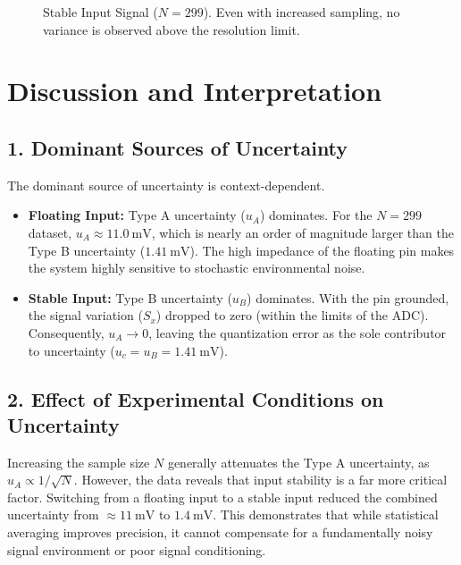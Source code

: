 \documentclass[11pt]{article}
\begin{document}
\begin{figure}[H]
  \centering
  \caption{Stable Input Signal ($N=299$). Even with increased sampling, no variance is observed above the resolution limit.}
  \label{fig:stable_300}
\end{figure}

\section{Discussion and Interpretation}

\subsection{1. Dominant Sources of Uncertainty}
The dominant source of uncertainty is context-dependent.
\begin{itemize}
  \item \textbf{Floating Input:} Type A uncertainty ($u_A$) dominates. For the $N=299$ dataset, $u_A \approx \SI{11.0}{\milli\volt}$, which is nearly an order of magnitude larger than the Type B uncertainty ($\SI{1.41}{\milli\volt}$). The high impedance of the floating pin makes the system highly sensitive to stochastic environmental noise.
  \item \textbf{Stable Input:} Type B uncertainty ($u_B$) dominates. With the pin grounded, the signal variation ($S_x$) dropped to zero (within the limits of the ADC). Consequently, $u_A \rightarrow 0$, leaving the quantization error as the sole contributor to uncertainty ($u_c = u_B = \SI{1.41}{\milli\volt}$).
\end{itemize}

\subsection{2. Effect of Experimental Conditions on Uncertainty}
Increasing the sample size $N$ generally attenuates the Type A uncertainty, as $u_A \propto 1/\sqrt{N}$. However, the data reveals that input stability is a far more critical factor. Switching from a floating input to a stable input reduced the combined uncertainty from $\approx \SI{11}{\milli\volt}$ to $\SI{1.4}{\milli\volt}$. This demonstrates that while statistical averaging improves precision, it cannot compensate for a fundamentally noisy signal environment or poor signal conditioning.
\end{document}

